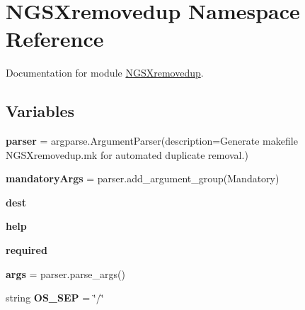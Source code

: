 \hypertarget{namespaceNGSXremovedup}{}\section{N\+G\+S\+Xremovedup Namespace Reference}
\label{namespaceNGSXremovedup}


Documentation for module \hyperlink{namespaceNGSXremovedup}{N\+G\+S\+Xremovedup}.  


\subsection*{Variables}
\begin{DoxyCompactItemize}
\item 
{\bfseries parser} = argparse.\+Argument\+Parser(description=\textquotesingle{}Generate makefile N\+G\+S\+Xremovedup.\+mk for automated duplicate removal.\textquotesingle{})\hypertarget{namespaceNGSXremovedup_a80aad1799840e6b83e22ada199a7f409}{}\label{namespaceNGSXremovedup_a80aad1799840e6b83e22ada199a7f409}

\item 
{\bfseries mandatory\+Args} = parser.\+add\+\_\+argument\+\_\+group(\textquotesingle{}Mandatory\textquotesingle{})\hypertarget{namespaceNGSXremovedup_a1c7d27191f568bf1f020005bbd165a9b}{}\label{namespaceNGSXremovedup_a1c7d27191f568bf1f020005bbd165a9b}

\item 
{\bfseries dest}\hypertarget{namespaceNGSXremovedup_acdcd471288c3fc42065b44e7dfc66aa1}{}\label{namespaceNGSXremovedup_acdcd471288c3fc42065b44e7dfc66aa1}

\item 
{\bfseries help}\hypertarget{namespaceNGSXremovedup_a8e0ad0a9c1b831f8e834b40024f51861}{}\label{namespaceNGSXremovedup_a8e0ad0a9c1b831f8e834b40024f51861}

\item 
{\bfseries required}\hypertarget{namespaceNGSXremovedup_a5b0a5eb123dbc14d192305c3981cb641}{}\label{namespaceNGSXremovedup_a5b0a5eb123dbc14d192305c3981cb641}

\item 
{\bfseries args} = parser.\+parse\+\_\+args()\hypertarget{namespaceNGSXremovedup_a4bd1bf841f557020cf892ee3ea6ac3e1}{}\label{namespaceNGSXremovedup_a4bd1bf841f557020cf892ee3ea6ac3e1}

\item 
string {\bfseries O\+S\+\_\+\+S\+EP} = \char`\"{}/\char`\"{}\hypertarget{namespaceNGSXremovedup_a6dba484fd313aeeefa99eee4303c50a5}{}\label{namespaceNGSXremovedup_a6dba484fd313aeeefa99eee4303c50a5}


\end{DoxyCompactItemize}
